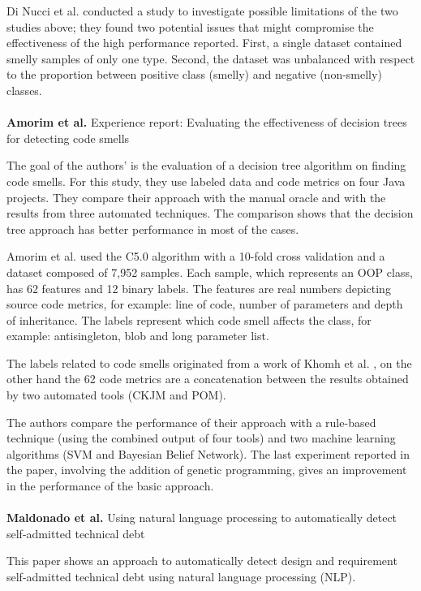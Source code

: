 Di Nucci et al. \cite{di2018detecting} conducted a study to investigate possible limitations of the two studies above; they found two potential issues that might compromise the effectiveness of the high performance reported. 
First, a single dataset contained smelly samples of only one type. Second, the dataset was unbalanced with respect to the proportion between positive class (smelly) and negative (non-smelly) classes.
\\
\\
\textbf{Amorim et al.} \cite{amorim2015experience} Experience report: Evaluating the effectiveness of decision trees for detecting code smells

The goal of the authors' is the evaluation of a decision tree algorithm on finding code smells. For this study, they use labeled data and code metrics on four Java projects.
They compare their approach with the manual oracle and with the results from three automated techniques. 
The comparison shows that the decision tree approach has better performance in most of the cases.

Amorim et al. used the C5.0 algorithm with a 10-fold cross validation and a dataset composed of 7,952 samples. Each sample, which represents an OOP class, has 62 features and 12 binary labels. The features are real numbers depicting source code metrics, for example: line of code, number of parameters and depth of inheritance. The labels represent which code smell affects the class, for example: antisingleton, blob and long parameter list.

The labels related to code smells originated from a work of Khomh et al. \cite{khomh2012exploratory}, on the other hand the 62 code metrics are a concatenation between the results obtained by two automated tools (CKJM and POM).

The authors compare the performance of their approach with a rule-based technique (using the combined output of four tools) and two machine learning algorithms (SVM and Bayesian Belief Network).
The last experiment reported in the paper, involving the addition of genetic programming, gives an improvement in the performance of the basic approach.
\\
\\
\textbf{Maldonado et al.} \cite{maldonado2017using} Using natural language processing to automatically detect self-admitted technical debt

This paper shows an approach to automatically detect design and requirement self-admitted technical debt using natural language processing (NLP). 

